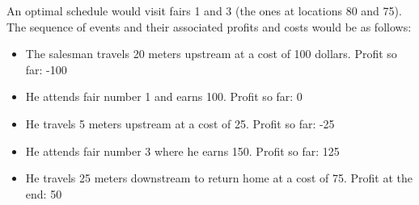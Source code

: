 An optimal schedule would visit fairs 1 and 3 (the ones at locations 80 and 75). The sequence of events and their associated profits and costs would be as follows:
\begin{itemize}
\item The salesman travels 20 meters upstream at a cost of 100 dollars. Profit so far: -100
\item He attends fair number 1 and earns 100. Profit so far: 0
\item He travels 5 meters upstream at a cost of 25. Profit so far: -25
\item He attends fair number 3 where he earns 150. Profit so far: 125
\item He travels 25 meters downstream to return home at a cost of 75. Profit at the end: 50 
\end{itemize}
